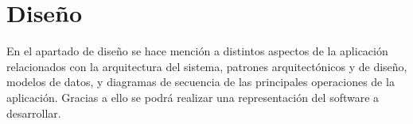\chapter{Diseño}

En el apartado de diseño se hace mención a distintos aspectos de la aplicación relacionados con la arquitectura del sistema, patrones arquitectónicos y de diseño, modelos de datos, y diagramas de secuencia de las principales operaciones de la aplicación. Gracias a ello se podrá realizar una representación del software a desarrollar.






